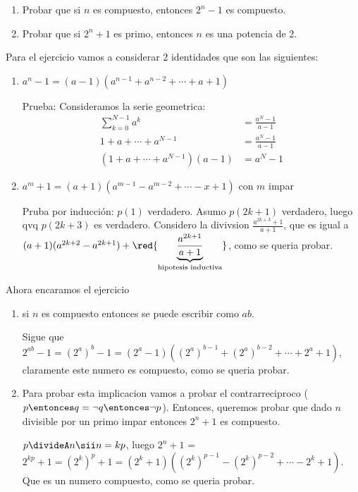 \begin{enunciado}{\ejercicio}
  \begin{enumerate}[label=\roman*)]
    \item Probar que si $n$ es compuesto, entonces $2^n - 1$ es compuesto. 
    \item Probar que si $2^n + 1$ es primo, entonces $n$ es una potencia de 2. 
  \end{enumerate}
\end{enunciado}

Para el ejercicio vamos a considerar 2 identidades que son las siguientes: 
\begin{enumerate}[label=\alph*)]
\item $a^n - 1 = (a - 1)(a^{n-1} + a^{n-2} + \cdots + a + 1)$

Prueba: Consideramos la serie geometrica: 
\begin{align*}
\sum_{k=0}^{N - 1} a^k &= \frac{a^N - 1}{a - 1} \\
1 + a + \cdots + a^{N - 1} &= \frac{a^N - 1}{a - 1} \\
(1 + a + \cdots + a^{N - 1})(a - 1) &= a^N - 1
\end{align*}

\item $a^m + 1 = (a + 1)(a^{m-1} - a^{m-2} + \cdots - x + 1)$ con $m$ impar 

Pruba por inducción: $p(1)$ verdadero. Asumo $p(2k + 1)$ verdadero, luego qvq $p(2k + 3)$ es verdadero. 
Considero la divivsion $\frac{a^{2k + 3} + 1}{a + 1}$, que es igual a $(a + 1)(a^{2k + 2} - a^{2k + 1})
+ \red{\underbrace{\frac{a^{2k + 1}}{a + 1}}_{\text{hipotesis inductiva}}}$, como se queria probar.

\end{enumerate}

Ahora encaramos el ejercicio
\begin{enumerate}[label = \roman*)]
 \item si $n$ es compuesto entonces se puede escribir como $ab$. 
 
 Sigue que $2^{ab} - 1 = (2^a)^b - 1 = (2^a - 1)((2^a)^{b-1} + (2^a)^{b - 2} + \cdots + 2^a + 1)$, 
 claramente este numero es compuesto, como se queria probar.

 \item Para probar esta implicacion vamos a probar el contrarreciproco ($p \entonces q = \lnot q \entonces \lnot p$). 
 Entonces, queremos probar que dado $n$ divisible por un primo impar entonces $2^n + 1$ es compuesto. 

 $p \divideA n \sii n = kp$, luego $2^n + 1$ = $2^{kp} + 1 = (2^k)^p + 1 = (2^k + 1)((2^k)^{p - 1} - (2^k)^{p - 2} + \cdots - 2^k + 1)$. 
 Que es un numero compuesto, como se queria probar. 
\end{enumerate}

\begin{aportes}
 \item {}
\end{aportes}